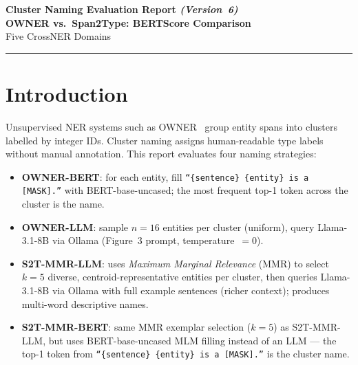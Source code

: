 \documentclass[11pt,a4paper]{article}
\begin{document}
\begin{center}
  {\LARGE\bfseries\color{ownerblue}
    Cluster Naming Evaluation Report \normalsize\textit{(Version~6)}\\[0.4em]
    \large OWNER vs.\ Span2Type: BERTScore Comparison}\\[0.8em]
  {\large Five CrossNER Domains}\\[0.6em]
\end{center}
\vspace{0.4em}\hrule\vspace{1.2em}

\begin{abstract}
This report compares four cluster-naming methods across five CrossNER domains
(AI, Literature, Music, Politics, Science) using BERTScore (RoBERTa-large)
against confusion-matrix-derived ground-truth labels,
All scores are measured at the \textbf{Entity Typing (ET) stage}.
Two methods belong to \textbf{OWNER}: BERT-based MLM voting (avg
F$_1{=}0.897$) and LLM-based naming via Ollama (avg F$_1{=}0.908$).
Two methods belong to \textbf{Span2Type}, both using Maximum Marginal
Relevance (MMR) exemplar selection:
MMR-LLM naming (avg F$_1{=}0.924$, best overall) and MMR-BERT naming
(avg F$_1{=}0.896$).
All scores use the corrected ground truth established in Version~5.
S2T-MMR-LLM is the strongest method; LLM-based methods consistently
outperform MLM/BERT voting across all domains.
\end{abstract}

\section{Introduction}

Unsupervised NER systems such as OWNER~\cite{genest2025owner} group entity
spans into clusters labelled by integer IDs.
Cluster naming assigns human-readable type labels without manual annotation.
This report evaluates four naming strategies:

\begin{itemize}[leftmargin=1.5em]
  \item \textbf{OWNER-BERT}: for each entity, fill
    \texttt{``\{sentence\} \{entity\} is a [MASK].''} with BERT-base-uncased;
    the most frequent top-1 token across the cluster is the name.
  \item \textbf{OWNER-LLM}: sample $n{=}16$ entities per cluster (uniform),
    query Llama-3.1-8B via Ollama (Figure~3 prompt, temperature~$=0$).
  \item \textbf{S2T-MMR-LLM}: uses \textit{Maximum Marginal Relevance}
    (MMR) to select $k{=}5$ diverse, centroid-representative entities per
    cluster, then queries Llama-3.1-8B via Ollama with full example sentences
    (richer context); produces multi-word descriptive names.
  \item \textbf{S2T-MMR-BERT}: same MMR exemplar selection ($k{=}5$) as
    S2T-MMR-LLM, but uses BERT-base-uncased MLM filling instead of an LLM
    — the top-1 token from \texttt{``\{sentence\} \{entity\} is a [MASK].''}
    is the cluster name.
\end{itemize}
\end{document}

